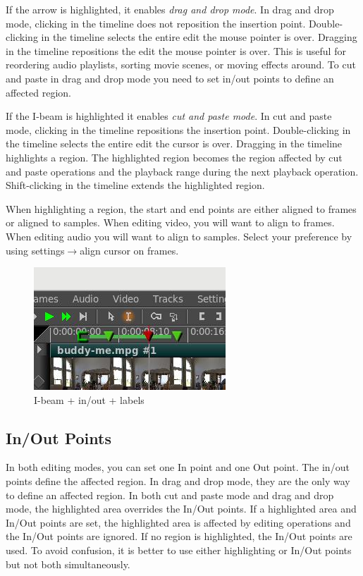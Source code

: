 If the arrow is highlighted, it enables \emph{drag and drop mode}.  
In drag and drop mode, clicking in the timeline does not reposition the insertion point.  
Double-clicking in the timeline selects the entire edit the mouse pointer is over.  
Dragging in the timeline repositions the edit the mouse pointer is over. 
This is useful for reordering audio playlists, sorting movie scenes, or moving effects around. 
To cut and paste in drag and drop mode you need to set in/out points to define an affected region. 

If the I-beam is highlighted it enables \emph{cut and paste mode}. 
In cut and paste mode, clicking in the timeline repositions the insertion point. 
Double-clicking in the timeline selects the entire edit the cursor is over. 
Dragging in the timeline highlights a region. 
The highlighted region becomes the region affected by cut and paste operations and the playback range during the next playback operation. 
Shift-clicking in the timeline extends the highlighted region.

When highlighting a region, the start and end points are either aligned to frames or aligned to samples. When editing video, you will want to align to frames. When editing audio you will want to align to samples. Select your preference by using settings$\rightarrow$align cursor on frames.

\begin{figure}[htpb]
    \centering
    \includegraphics[width=0.4\linewidth]{images/i-beam.png}
    \caption{I-beam + in/out  +  labels}
    \label{fig:i-beam}
\end{figure}

\subsection{In/Out Points}%
\label{sub:in_out_points}

In both editing modes, you can set one In point and one Out point. 
The in/out points define the affected region. 
In drag and drop mode, they are the only way to define an affected region. 
In both cut and paste mode and drag and drop mode, the highlighted area overrides the In/Out points. 
If a highlighted area and In/Out points are set, the highlighted area is affected by editing operations and the In/Out points are ignored. 
If no region is highlighted, the In/Out points are used. 
To avoid confusion, it is better to use either highlighting or In/Out points but not both simultaneously.

